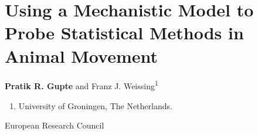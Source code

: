 
%
\chapter{Using a Mechanistic Model to Probe Statistical Methods in Animal Movement}\label{ch:patternprocess}

{\noindent \textbf{Pratik R. Gupte} and Franz J. Weissing\textsuperscript{1}}

    \medskip

    {\normalsize{}}
    
    \begin{enumerate}
        \item University of Groningen, The Netherlands.
    \end{enumerate}
    
    \medskip

    {\normalsize{}}

    European Research Council

\clearpage
